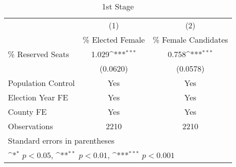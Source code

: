 \begin{table}
    \caption{1st Stage}
    {
        \def\sym#1{\ifmmode^{#1}\else\(^{#1}\)\fi}
        \begin{tabular}{l*{2}{c}}
            \toprule
                               & \multicolumn{1}{c}{(1)}               & \multicolumn{1}{c}{(2)}                  \\
                               & \multicolumn{1}{c}{\% Elected Female} & \multicolumn{1}{c}{\% Female Candidates} \\
            \midrule
            \% Reserved Seats  & 1.029\sym{***}                        & 0.758\sym{***}                           \\
                               & (0.0620)                              & (0.0578)                                 \\
            Population Control & Yes                                   & Yes                                      \\
            Election Year FE   & Yes                                   & Yes                                      \\
            County FE          & Yes                                   & Yes                                      \\
            \midrule
            Observations       & 2210                                  & 2210                                     \\
            \bottomrule
            \multicolumn{3}{l}{\footnotesize Standard errors in parentheses}                                      \\
            \multicolumn{3}{l}{\footnotesize \sym{*} \(p<0.05\), \sym{**} \(p<0.01\), \sym{***} \(p<0.001\)}      \\
        \end{tabular}
    }
\end{table}